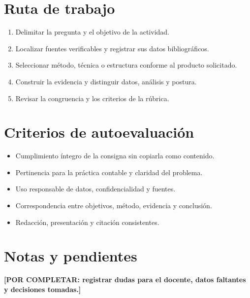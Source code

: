 \documentclass[spanish,letterpaper,oneside]{article}
\newcommand{\porcompletar}[1]{\textcolor{uasBlue}{\textbf{[POR COMPLETAR: #1]}}}
\begin{document}
\section{Ruta de trabajo}
\begin{enumerate}
  \item Delimitar la pregunta y el objetivo de la actividad.
  \item Localizar fuentes verificables y registrar sus datos bibliográficos.
  \item Seleccionar método, técnica o estructura conforme al producto solicitado.
  \item Construir la evidencia y distinguir datos, análisis y postura.
  \item Revisar la congruencia y los criterios de la rúbrica.
\end{enumerate}

\section{Criterios de autoevaluación}
\begin{itemize}
  \item Cumplimiento íntegro de la consigna sin copiarla como contenido.
  \item Pertinencia para la práctica contable y claridad del problema.
  \item Uso responsable de datos, confidencialidad y fuentes.
  \item Correspondencia entre objetivos, método, evidencia y conclusión.
  \item Redacción, presentación y citación consistentes.
\end{itemize}

\section{Notas y pendientes}
\porcompletar{registrar dudas para el docente, datos faltantes y decisiones tomadas.}


\end{document}
